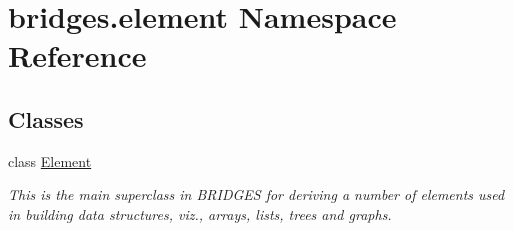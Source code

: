 \hypertarget{namespacebridges_1_1element}{}\section{bridges.\+element Namespace Reference}
\label{namespacebridges_1_1element}
\subsection*{Classes}
\begin{DoxyCompactItemize}
\item 
class \hyperlink{classbridges_1_1element_1_1_element}{Element}
\begin{DoxyCompactList}\small\item\em This is the main superclass in B\+R\+I\+D\+G\+ES for deriving a number of elements used in building data structures, viz., arrays, lists, trees and graphs. \end{DoxyCompactList}\end{DoxyCompactItemize}
